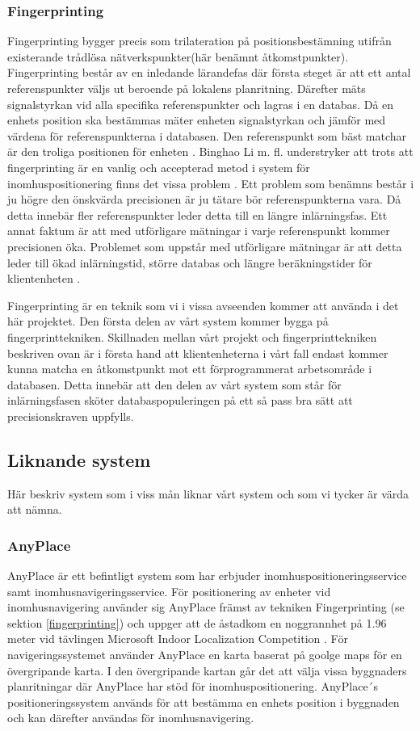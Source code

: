 \documentclass[swedish, a4paper,12pt]{article}
\begin{document}
\subsubsection{Fingerprinting}
Fingerprinting bygger precis som trilateration på positionsbestämning utifrån existerande trådlösa nätverkspunkter(här benämnt åtkomstpunkter). Fingerprinting består av en inledande lärandefas där första steget är att ett antal referenspunkter väljs ut beroende på lokalens planritning. Därefter mäts signalstyrkan vid alla specifika referenspunkter och lagras i en databas. %
Då en enhets position ska bestämmas mäter enheten signalstyrkan och jämför med värdena för referenspunkterna i databasen. Den referenspunkt som bäst matchar är den troliga positionen för enheten \cite{IP1}\cite{jun2018low}.
Binghao Li m. fl. understryker att trots att fingerprinting är en vanlig och accepterad metod i system för inomhuspositionering finns det vissa problem \cite{IP1}.
Ett problem som benämns består i ju högre den önskvärda precisionen är ju tätare bör referenspunkterna vara. Då detta innebär fler referenspunkter leder detta till en längre inlärningsfas. Ett annat faktum är att med utförligare mätningar i varje referenspunkt kommer precisionen öka. Problemet som uppstår med utförligare mätningar är att detta leder till ökad inlärningstid, större databas och längre beräkningstider för klientenheten \cite{IP1}.

Fingerprinting är en teknik som vi i vissa avseenden kommer att använda i det här projektet. Den första delen av vårt system kommer bygga på fingerprinttekniken. Skillnaden mellan vårt projekt och fingerprinttekniken beskriven ovan är i första hand att klientenheterna i vårt fall endast kommer kunna matcha en åtkomstpunkt mot ett förprogrammerat arbetsområde i databasen. Detta innebär att den delen av vårt system som står för inlärningsfasen sköter databaspopuleringen på ett så pass bra sätt att precisionskraven uppfylls.
\fi

\subsection{Liknande system}
Här beskriv system som i viss mån liknar vårt system och som vi tycker är värda att nämna.
\subsubsection{AnyPlace}
AnyPlace är ett befintligt system som har erbjuder inomhuspositioneringsservice samt inomhusnavigeringsservice. För positionering av enheter vid inomhusnavigering använder sig AnyPlace främst av tekniken Fingerprinting (se sektion \ref{fingerprinting}) och uppger att de åstadkom en noggrannhet på 1.96 meter vid tävlingen Microsoft Indoor Localization Competition \cite{anyplace}
\cite{IPS_tavling}.
För navigeringssystemet använder AnyPlace en karta baserat på goolge maps för en övergripande karta. I den övergripande kartan går det att välja vissa byggnaders planritningar där AnyPlace har stöd för inomhuspositionering. AnyPlace´s positioneringssystem används för att bestämma en enhets position i byggnaden och kan därefter användas för inomhusnavigering.
\end{document}
